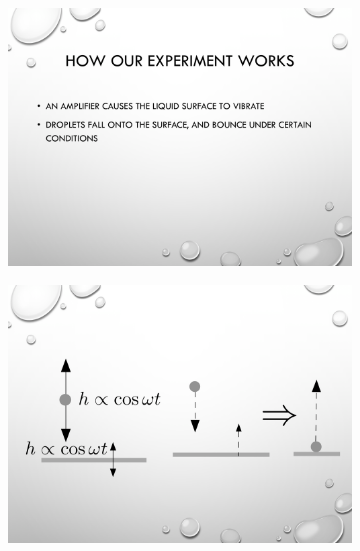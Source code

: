 \begin{figure}[hb]
\begin{subfigure}{0.475\textwidth}
\includegraphics[width=\textwidth]{education/ppt/03.png}
\end{subfigure}
\hfill
\begin{subfigure}{0.475\textwidth}
\includegraphics[width=\textwidth]{education/ppt/04.png}
\end{subfigure}
\\


\end{figure}

